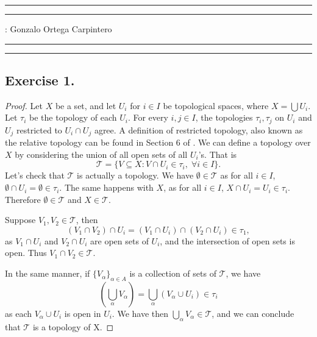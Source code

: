 \documentclass[11pt,a4paper]{article}
\begin{document}
\hrule\hrule
\vspace{1mm}


\vspace{1mm}

 : Gonzalo Ortega Carpintero
\vspace{2mm}

\hrule\hrule

\subsection*{Exercise 1.}
\begin{proof}
  Let $ X $ be a set, and let $ U_i $ for $ i \in I $ be topological spaces, where $ X = \bigcup U_i $. Let $ \tau_i $ be the topology of each $ U_i $. For every $ i, j \in I $, the topologies $ \tau_i, \tau_j $ on $ U_i $ and $ U_j $ restricted to $ U_i \cap U_j $ agree. A definition of restricted topology, also known as the relative topology can be found in Section 6 of \cite{will}. We can define a topology over $ X $ by considering the union of all open sets of all $ U_i$'s. That is 
  $$
    \mathcal T = \{ V \subseteq X : V \cap U_i \in \tau_i, \; \forall i \in I\}.
  $$
  Let's check that $ \mathcal T $ is actually a topology. We have $ \emptyset \in \mathcal T $ as for all $i \in I $, $\emptyset \cap U_i = \emptyset \in \tau_i $. The same happens with $ X $, as for all $ i\in I$, $X \cap U_i = U_i \in \tau_i$. Therefore $ \emptyset \in \mathcal T $ and $ X \in \mathcal T $.

  \vspace{1mm}
  Suppose $ V_1, V_2 \in \mathcal T $, then
  $$
    (V_1 \cap V_2) \cap U_i = (V_1\cap U_i) \cap (V_2 \cap U_i) \in \tau_1,
  $$
  as $ V_1\cap U_i $ and $ V_2\cap U_i $ are open sets of $U_i$, and the intersection of open sets is open. Thus $ V_1 \cap V_2 \in \mathcal T $.

  \vspace{1mm}
  In the same manner, if $ \{V_\alpha\}_{\alpha \in A}$ is a collection of sets of $ \mathcal T $, we have
  $$
    \left(\bigcup_\alpha V_\alpha \right) = \bigcup_\alpha (V_\alpha \cup U_i) \in \tau_i
  $$
  as each $ V_\alpha \cup U_i $ is open in $U_i$. We have then $ \bigcup_\alpha V_\alpha \in \mathcal T $, and we can conclude that $ \mathcal T $ is a topology of X.


\end{proof}
\end{document}
